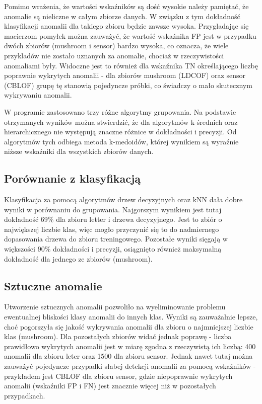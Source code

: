 \documentclass[11pt,a4paper,twoside]{article}
\begin{document}
Pomimo wrażenia, że wartości wskaźników są dość wysokie należy pamiętać, że anomalie są nieliczne w całym zbiorze danych. W związku z tym dokładność klasyfikacji anomalii dla takiego zbioru będzie zawsze wysoka. Przygladając się macierzom pomyłek można zauważyć, że wartość wskaźnika FP jest w przypadku dwóch zbiorów (mushroom i sensor) bardzo wysoka, co oznacza, że wiele przykladów nie zostało uznanych za anomalie, chociaż w rzeczywistości anomaliami były. Widoczne jest to również dla wskaźnika TN określającego liczbę poprawnie wykrytych anomalii - dla zbiorów mushroom (LDCOF) oraz sensor (CBLOF) grupę tę stanowią pojedyncze próbki, co świadczy o mało skutecznym wykrywaniu anomalii.

W programie zastosowano trzy różne algorytmy grupowania. Na podstawie otrzymanych wyników można stwierdzić, że dla algorytmów k-średnich oraz hierarchicznego nie występują znaczne różnice w dokładności i precyzji. Od algorytmów tych odbiega metoda k-medoidów, której wynikiem są wyraźnie niższe wskaźniki dla wszystkich zbiorów danych.

\subsection {Porównanie z klasyfikacją}

Klasyfikacja za pomocą algorytmów drzew decyzyjnych oraz kNN dała dobre wyniki w porównaniu do grupowania. Najgorszym wynikiem jest tutaj dokładność 69\% dla zbioru letter i drzewa decyzyjnego. Jest to zbiór o największej liczbie klas, więc mogło przyczynić się to do nadmiernego dopasowania drzewa do zbioru treningowego. Pozostałe wyniki sięgają w większości 90\% dokładności i precyzji, osiągnięto również maksymalną dokładność dla jednego ze zbiorów (mushroom).

\subsection {Sztuczne anomalie}

Utworzenie sztucznych anomalii pozwoliło na wyeliminowanie problemu ewentualnej bliskości klasy anomalii do innych klas. Wyniki są zauważalnie lepsze, choć pogorszyła się jakość wykrywania anomalii dla zbioru o najmniejszej liczbie klas (mushroom). Dla pozostałych zbiorów widać jednak poprawę - liczba prawidłowo wykrytych anomalii jest w miarę zgodna z rzeczywistą ich liczbą: 400 anomalii dla zbioru leter oraz 1500 dla zbioru sensor. Jednak nawet tutaj można zauważyć pojedyncze przypadki słabej detekcji anomalii za pomocą wskaźników - przykładem jest CBLOF dla zbioru sensor, gdzie niepoprawnie wykrytych anomalii (wskaźniki FP i FN) jest znacznie więcej niż w pozostałych przypadkach.
\end{document}

